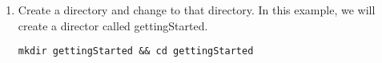 \documentclass{ximera}
\begin{document}
\begin{enumerate}
\item Create a directory and change to that directory.
In this example, we will create a director called gettingStarted.
\begin{center}\tt mkdir gettingStarted && cd gettingStarted\end{center}
\end{enumerate}
\end{document}

